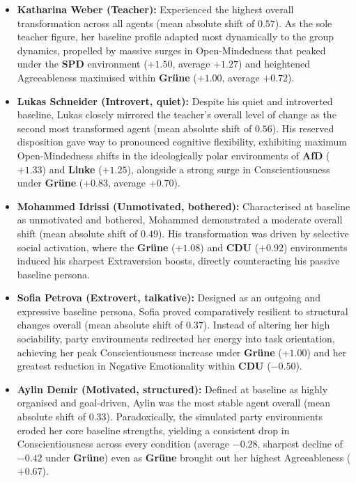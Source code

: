 \begin{itemize}
    \item \textbf{Katharina Weber (Teacher):} Experienced the highest overall transformation across all agents (mean absolute shift of $0.57$). As the sole teacher figure, her baseline profile adapted most dynamically to the group dynamics, propelled by massive surges in Open-Mindedness that peaked under the \textbf{SPD} environment ($+1.50$, average $+1.27$) and heightened Agreeableness maximised within \textbf{Gr\"une} ($+1.00$, average $+0.72$).
    \item \textbf{Lukas Schneider (Introvert, quiet):} Despite his quiet and introverted baseline, Lukas closely mirrored the teacher's overall level of change as the second most transformed agent (mean absolute shift of $0.56$). His reserved disposition gave way to pronounced cognitive flexibility, exhibiting maximum Open-Mindedness shifts in the ideologically polar environments of \textbf{AfD} ($+1.33$) and \textbf{Linke} ($+1.25$), alongside a strong surge in Conscientiousness under \textbf{Gr\"une} ($+0.83$, average $+0.70$).
    \item \textbf{Mohammed Idrissi (Unmotivated, bothered):} Characterised at baseline as unmotivated and bothered, Mohammed demonstrated a moderate overall shift (mean absolute shift of $0.49$). His transformation was driven by selective social activation, where the \textbf{Gr\"une} ($+1.08$) and \textbf{CDU} ($+0.92$) environments induced his sharpest Extraversion boosts, directly counteracting his passive baseline persona.
    \item \textbf{Sofia Petrova (Extrovert, talkative):} Designed as an outgoing and expressive baseline persona, Sofia proved comparatively resilient to structural changes overall (mean absolute shift of $0.37$). Instead of altering her high sociability, party environments redirected her energy into task orientation, achieving her peak Conscientiousness increase under \textbf{Gr\"une} ($+1.00$) and her greatest reduction in Negative Emotionality within \textbf{CDU} ($-0.50$).
    \item \textbf{Aylin Demir (Motivated, structured):} Defined at baseline as highly organised and goal-driven, Aylin was the most stable agent overall (mean absolute shift of $0.33$). Paradoxically, the simulated party environments eroded her core baseline strengths, yielding a consistent drop in Conscientiousness across every condition (average $-0.28$, sharpest decline of $-0.42$ under \textbf{Gr\"une}) even as \textbf{Gr\"une} brought out her highest Agreeableness ($+0.67$).
\end{itemize}

